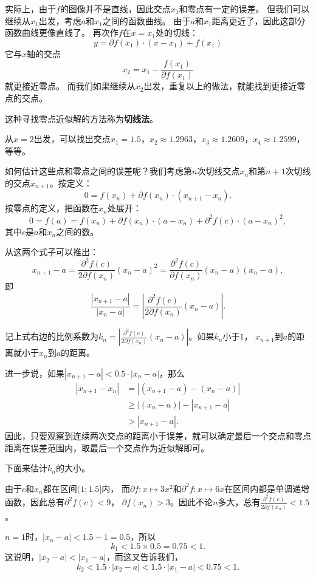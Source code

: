 \documentclass[12pt,UTF8]{ctexbook}
\theoremstyle{definition}
\theoremstyle{plain}
\begin{document}
实际上，由于$f$的图像并不是直线，因此交点$x_1$和零点有一定的误差。
但我们可以继续从$x_1$出发，考虑$a$和$x_1$之间的函数曲线。
由于$a$和$x_1$距离更近了，因此这部分函数曲线更像直线了。
再次作$f$在$x=x_1$处的切线：
$$ y = \partial f(x_1)\cdot (x - x_1) + f(x_1) $$
它与$x$轴的交点
$$ x_2 = x_1 - \frac{f(x_1)}{\partial f(x_1)} $$
就更接近零点。
而我们如果继续从$x_2$出发，重复以上的做法，就能找到更接近零点的交点。

这种寻找零点近似解的方法称为\textbf{切线法}。

从$x=2$出发，可以找出交点$x_1 = 1.5$，$x_2 \approx 1.2963$，$x_3 \approx 1.2609$，$x_4 \approx 1.2599$，等等。

如何估计这些点和零点之间的误差呢？我们考虑第$n$次切线交点$x_n$和第$n+1$次切线的交点$x_{n+1}$。按定义：
$$ 0 = f(x_n) + \partial f(x_n)\cdot (x_{n+1} - x_n). $$
按零点的定义，把函数在$x_n$处展开：
$$ 0 = f(a) = f(x_n) + \partial f(x_n)\cdot (a - x_n) + \partial^2 f(c)\cdot (a - x_n)^2, $$
其中$c$是$a$和$x_n$之间的数。

从这两个式子可以推出：
$$ x_{n+1} - a = \frac{\partial^2 f(c)}{2\partial f(x_n)} (x_n - a)^2 = \frac{\partial^2 f(c)}{\partial f(x_n)} (x_n - a)(x_n - a),$$
即
$$ \frac{\left| x_{n+1} - a \right|}{\left| x_n - a \right|} = \left| \frac{\partial^2 f(c)}{2\partial f(x_n)} (x_n - a)\right|.$$

记上式右边的比例系数为$k_n =  \left|\frac{\partial^2 f(c)}{2\partial f(x_n)} (x_n - a)\right|$。如果$k_n$小于$1$，
$x_{n+1}$到$a$的距离就小于$x_n$到$a$的距离。

进一步说，如果$\left| x_{n+1} - a \right| < 0.5 \cdot \left| x_n - a \right|$，那么
\begin{align*}
    \left| x_{n+1} - x_n \right| &= \left| (x_{n+1} - a) - (x_n - a) \right| \\
    &\geqslant  \left| (x_n - a) \right| - \left| x_{n+1} - a \right| \\
    &> \left| x_{n+1} - a \right|.
\end{align*}
因此，只要观察到连续两次交点的距离小于误差，就可以确定最后一个交点和零点距离在误差范围内，取最后一个交点作为近似解即可。

下面来估计$k_n$的大小。

由于$c$和$x_n$都在区间$(1;1.5]$内，
而$\partial f: x\mapsto 3x^2$和$\partial^2 f: x\mapsto 6x$在区间内都是单调递增函数，因此总有$\partial^2 f(c) < 9$，
$\partial f(x_n) > 3$。因此不论$n$多大，总有$\frac{\partial^2 f(c)}{2\partial f(x_n)} < 1.5$。

$n=1$时，$|x_n - a| < 1.5 - 1 = 0.5$，所以
$$k_1 < 1.5 \times 0.5 = 0.75 < 1.$$
这说明，$|x_2 - a| < |x_1 - a|$，而这又告诉我们，
$$k_2 < 1.5 \cdot |x_2 - a| < 1.5 \cdot |x_1 - a| <0.75 < 1.$$
\end{document}
